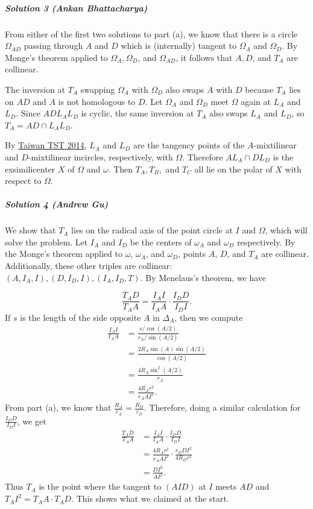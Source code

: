 \documentclass[11pt]{scrartcl}
\begin{document}
\subparagraph{Solution 3 (Ankan Bhattacharya)}

From either of the first two solutions to part (a), we know that there is a
circle $\Omega_{AD}$ passing through $A$ and $D$ which is (internally) tangent
to $\Omega_A$ and $\Omega_D$. By Monge's theorem applied to $\Omega_A,
\Omega_D$, and $\Omega_{AD}$, it follows that $A, D$, and $T_A$ are collinear.

The inversion at $T_A$ swapping $\Omega_A$ with $\Omega_D$ also swaps $A$ with
$D$ because $T_A$ lies on $AD$ and $A$ is not homologous to $D$. Let $\Omega_A$
and $\Omega_D$ meet $\Omega$ again at $L_A$ and $L_D$. Since $ADL_AL_D$ is
cyclic, the same inversion at $T_A$ also swaps $L_A$ and $L_D$, so $T_A=AD\cap
L_AL_D$.

By \href{https://aops.com/community/c6h598547p3551881}{Taiwan TST
2014}, $L_A$ and $L_D$ are the tangency points of the $A$-mixtilinear and
$D$-mixtilinear incircles, respectively, with $\Omega$. Therefore $AL_A\cap
DL_D$ is the exsimilicenter $X$ of $\Omega$ and $\omega$. Then $T_A, T_B,$ and
$T_C$ all lie on the polar of $X$ with respect to $\Omega$.

\subparagraph{Solution 4 (Andrew Gu)}

We show that $T_A$ lies on the radical axis of the point circle at $I$ and
$\Omega$, which will solve the problem.  Let $I_A$ and $I_D$ be the centers of
$\omega_A$ and $\omega_D$ respectively. By the Monge's theorem applied to
$\omega$, $\omega_A$, and $\omega_D$, points $A$, $D$, and $T_A$ are collinear.
Additionally, these other triples are collinear: $(A, I_A, I), (D, I_D, I),
(I_A, I_D, T)$.  By Menelaus's theorem, we have

\[\frac{T_AD}{T_AA}=\frac{I_AI}{I_AA}\cdot\frac{I_DD}{I_DI}.\]
If $s$ is the length of the side opposite $A$ in $\Delta_A$, then we compute
\begin{align*}
  \frac{I_AI}{I_AA} &=\frac{s/\cos(A/2)}{r_A/\sin(A/2)} \\
                    &=\frac{2R_A\sin(A)\sin(A/2)}{\cos(A/2)} \\
                    &=\frac{4R_A\sin^2(A/2)}{r_A} \\
                    &=\frac{4R_Ar^2}{r_AAI^2}.
\end{align*}
From part (a), we know that $\frac{R_A}{r_A}=\frac{R_D}{r_D}$.
Therefore, doing a similar calculation for $\frac{I_DD}{I_DI}$, we get
\begin{align*}
  \frac{T_AD}{T_AA} &=\frac{I_AI}{I_AA}\cdot\frac{I_DD}{I_DI} \\
                    &=\frac{4R_Ar^2}{r_AAI^2}\cdot \frac{r_DDI^2}{4R_Dr^2} \\
                    &=\frac{DI^2}{AI^2}.
\end{align*}
Thus $T_A$ is the point where the tangent to $(AID)$ at $I$ meets $AD$ and
$T_AI^2=T_AA\cdot T_AD$. This shows what we claimed at the start.
\end{document}
